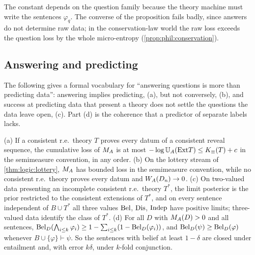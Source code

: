 The constant depends on the question family because the theory machine must write the sentences $\varphi_q$. The converse of the proposition fails badly, since answers do not determine raw data; in the conservation-law world the raw loss exceeds the question loss by the whole micro-entropy (\cref{prop:phil:conservation}).

\subsection{Answering and predicting}\label{app:phil:predicting}

The following gives a formal vocabulary for ``answering questions is more than predicting data'': answering implies predicting, (a), but not conversely, (b), and success at predicting data that present a theory does not settle the questions the data leave open, (c). Part (d) is the coherence that a predictor of separate labels lacks.

\begin{proposition}\label{prop:phil:predicting}
(a) If a consistent r.e.\ theory $T$ proves every datum of a consistent reveal sequence, the cumulative loss of $M_{A}$ is at most $-\log\mathbb{U}_{A}(\mathrm{Ext} T)\le K_{\equiv}(T)+c$ in the semimeasure convention, in any order.
(b) On the lottery stream of \cref{thm:logic:lottery}, $M_{A}$ has bounded loss in the semimeasure convention, while no consistent r.e.\ theory proves every datum and $W_{A}(D_n)\to0$.
(c) On two-valued data presenting an incomplete consistent r.e.\ theory $T^*$, the limit posterior is the prior restricted to the consistent extensions of $T^*$, and on every sentence independent of $B\cup T^*$ all three values $\mathrm{Bel}$, $\mathrm{Dis}$, $\mathrm{Indep}$ have positive limits; three-valued data identify the class of $T^*$.
(d) For all $D$ with $M_{A}(D)>0$ and all sentences, $\mathrm{Bel}_D(\bigwedge_{i\le k}\varphi_i)\ge1-\sum_{i\le k}(1-\mathrm{Bel}_D(\varphi_i))$, and $\mathrm{Bel}_D(\psi)\ge\mathrm{Bel}_D(\varphi)$ whenever $B\cup\{\varphi\}\vdash\psi$. So the sentences with belief at least $1-\delta$ are closed under entailment and, with error $k\delta$, under $k$-fold conjunction.
\end{proposition}

